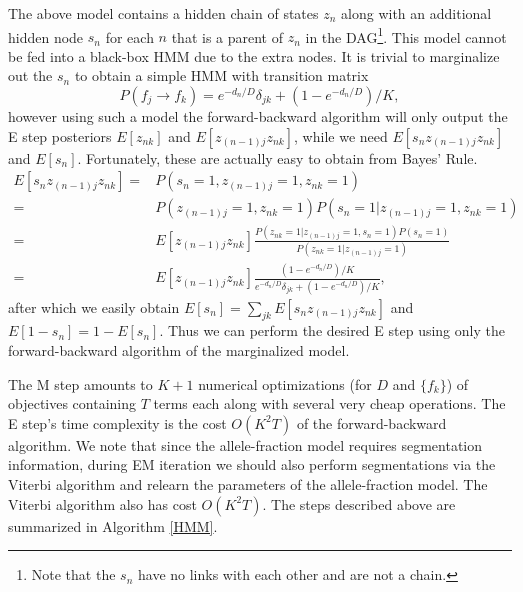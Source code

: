 \documentclass[nofootinbib,amssymb,amsmath]{revtex4}
\begin{document}
The above model contains a hidden chain of states $z_n$ along with an additional hidden node $s_n$ for each $n$ that is a parent of $z_n$ in the DAG\footnote{Note that the $s_n$ have no links with each other and are not a chain.}.  This model cannot be fed into a black-box HMM due to the extra nodes.  It is trivial to marginalize out the $s_n$ to obtain a simple HMM with transition matrix
\begin{equation}
P(f_j \rightarrow f_k) = e^{-d_n/D} \delta_{jk}  + (1-e^{-d_n/D}) / K,
\label{transition}
\end{equation}
however using such a model the forward-backward algorithm will only output the E step posteriors $E[z_{nk}]$ and $E[z_{(n-1)j} z_{nk}]$, while we need $E[s_n z_{(n-1)j} z_{nk}]$ and $E[s_n]$.  Fortunately, these are actually easy to obtain from Bayes' Rule.
%
\begin{align}
E \left[s_n  z_{(n-1)j} z_{nk} \right] =& P(s_n = 1, z_{(n-1)j} = 1, z_{nk} = 1) \\
=& P(z_{(n-1)j} = 1,  z_{nk} = 1) P(s_n = 1| z_{(n-1)j} = 1, z_{nk} = 1) \\
=& E[z_{(n-1)j} z_{nk}] \frac{ P(z_{nk} = 1 | z_{(n-1)j} = 1, s_n = 1 ) P(s_n = 1) }{ P(z_{nk} = 1 | z_{(n-1)j} = 1)} \\
=& E[z_{(n-1)j} z_{nk}] \frac{  (1 - e^{-d_n/D}) / K }{ e^{-d_n/D} \delta_{jk} + (1 - e^{-d_n/D}) / K},
\label{augmented_posterior}
\end{align}
%
after which we easily obtain $E[s_n] = \sum_{jk} E \left[s_n  z_{(n-1)j} z_{nk} \right]$ and $E[1-s_n] = 1 - E[s_n]$.  Thus we can perform the desired E step using only the forward-backward algorithm of the marginalized model.

The M step amounts to $K + 1$ numerical optimizations (for $D$ and $\{ f_k \}$) of objectives containing $T$ terms each along with several very cheap operations.  The E step's time complexity is the cost $O(K^2 T)$ of the forward-backward algorithm.  We note that since the allele-fraction model requires segmentation information, during EM iteration we should also perform segmentations via the Viterbi algorithm and relearn the parameters of the allele-fraction model.  The Viterbi algorithm also has cost $O(K^2 T)$.  The steps described above are summarized in Algorithm \ref{HMM}.
\end{document}
